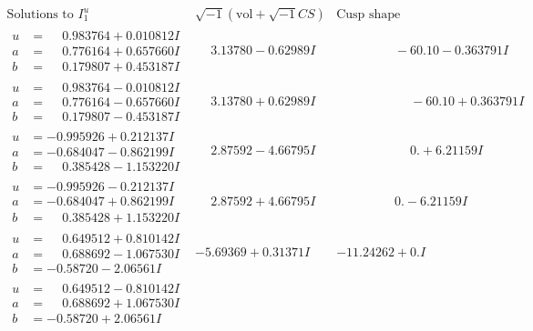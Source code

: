 \documentclass[1p]{elsarticle_modified}
\theoremstyle{definition}
\newcommand{\I}{\sqrt{-1}}
\begin{document}
$$\begin{array}{c|c|c}  
\text{Solutions to }I^u_{1}& \I (\text{vol} + \sqrt{-1}CS) & \text{Cusp shape}\\
 \hline 
\begin{aligned}
u &= \phantom{-}0.983764 + 0.010812 I \\
a &= \phantom{-}0.776164 + 0.657660 I \\
b &= \phantom{-}0.179807 + 0.453187 I\end{aligned}
 & \phantom{-}3.13780 - 0.62989 I & \phantom{-0.000000 }      -6
0. 10   - 0.363791 I \\ \hline\begin{aligned}
u &= \phantom{-}0.983764 - 0.010812 I \\
a &= \phantom{-}0.776164 - 0.657660 I \\
b &= \phantom{-}0.179807 - 0.453187 I\end{aligned}
 & \phantom{-}3.13780 + 0.62989 I & \phantom{-0.000000 -}     -6
0. 10   + 0.363791 I \\ \hline\begin{aligned}
u &= -0.995926 + 0.212137 I \\
a &= -0.684047 - 0.862199 I \\
b &= \phantom{-}0.385428 - 1.153220 I\end{aligned}
 & \phantom{-}2.87592 - 4.66795 I & \phantom{-0.000000 -}0. + 6.21159 I \\ \hline\begin{aligned}
u &= -0.995926 - 0.212137 I \\
a &= -0.684047 + 0.862199 I \\
b &= \phantom{-}0.385428 + 1.153220 I\end{aligned}
 & \phantom{-}2.87592 + 4.66795 I & \phantom{-0.000000 } 0. - 6.21159 I \\ \hline\begin{aligned}
u &= \phantom{-}0.649512 + 0.810142 I \\
a &= \phantom{-}0.688692 - 1.067530 I \\
b &= -0.58720 - 2.06561 I\end{aligned}
 & -5.69369 + 0.31371 I & -11.24262 + 0. I\phantom{ +0.000000I} \\ \hline\begin{aligned}
u &= \phantom{-}0.649512 - 0.810142 I \\
a &= \phantom{-}0.688692 + 1.067530 I \\
b &= -0.58720 + 2.06561 I\end{aligned}

\end{array}$$
\end{document}
